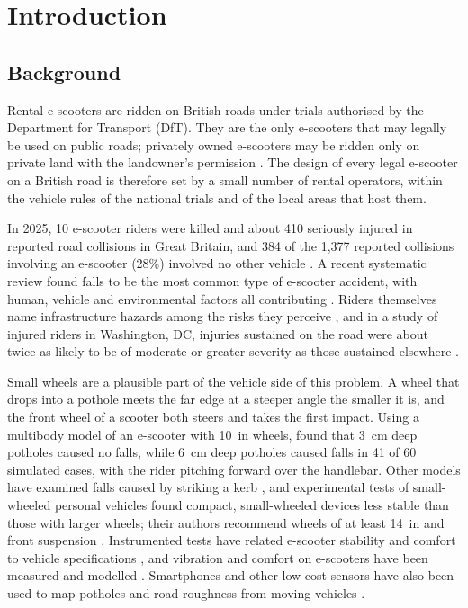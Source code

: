 \section{Introduction}\label{sec:intro}

\subsection{Background}

Rental e-scooters are ridden on British roads under trials authorised by the Department
for Transport (DfT). They are the only e-scooters that may legally be used on
public roads; privately owned e-scooters may be ridden only on private land with the
landowner's permission \autocite{dft2026users}. The design of every legal e-scooter on a
British road is therefore set by a small number of rental operators, within the vehicle
rules of the national trials and of the local areas that host them.

In 2025, 10 e-scooter riders were killed and about 410 seriously injured in reported road
collisions in Great Britain, and 384 of the 1,377 reported collisions involving an
e-scooter (28\%) involved no other vehicle \autocite{dft2026factsheet}. A recent systematic review found falls to be the most common
type of e-scooter accident, with human, vehicle and environmental factors all contributing
\autocite{nathania2026}. Riders themselves name infrastructure hazards among the risks they
perceive \autocite{anke2025}, and in a study of injured riders in Washington, DC, injuries
sustained on the road were about twice as likely to be of moderate or greater severity as
those sustained elsewhere \autocite{cicchino2021}.

Small wheels are a plausible part of the vehicle side of this problem. A wheel that drops into
a pothole meets the far edge at a steeper angle the smaller it is, and the front wheel of a
scooter both steers and takes the first impact. Using a multibody model of an e-scooter with
10~in wheels, \textcite{posirisuk2022} found that 3~cm deep potholes caused no falls, while
6~cm deep potholes caused falls in 41 of 60 simulated cases, with the rider pitching forward
over the handlebar. Other models have examined falls caused by striking a kerb
\autocite{fournier2023}, and experimental tests of small-wheeled personal vehicles found
compact, small-wheeled devices less stable than those with larger wheels; their authors
recommend wheels of at least 14~in and front suspension \autocite{paudel2025}. Instrumented
tests have related e-scooter stability and comfort to vehicle specifications
\autocite{leoni2022}, and vibration and comfort on e-scooters have been measured and modelled
\autocite{canomoreno2022,ventura2024,vacamichilena2026}. Smartphones and other low-cost
sensors have also been used to map potholes and road roughness from moving vehicles
\autocite{eriksson2008,zang2018}.

